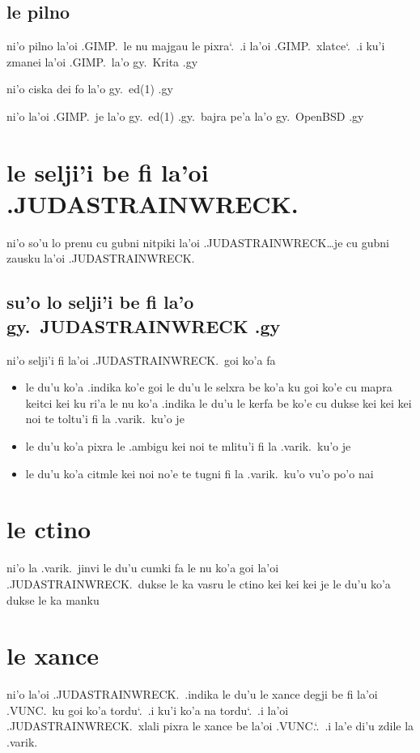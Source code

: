 \documentclass{report}
\newcommand\sds{\spacefactor\sfcode`.\ \space}
\begin{document}
\subsection{le pilno}
ni'o pilno la'oi .GIMP.\ le nu majgau le pixra\sds  .i  la'oi .GIMP.\ xlatce\sds  .i ku'i zmanei la'oi .GIMP.\ la'o gy.\ Krita .gy

ni'o ciska dei fo la'o gy.\ ed(1) .gy

ni'o la'oi .GIMP.\ je la'o gy.\ ed(1) .gy.\ bajra pe'a la'o gy.\ OpenBSD .gy

\section{le selji'i be fi la'oi .JUDASTRAINWRECK.}
ni'o so'u lo prenu cu gubni nitpiki la'oi .JUDASTRAINWRECK\ldots je cu gubni zausku la'oi .JUDASTRAINWRECK.

\subsection{su'o lo selji'i be fi la'o gy.\ JUDASTRAINWRECK .gy}
ni'o selji'i fi la'oi .JUDASTRAINWRECK.\ goi ko'a fa
\begin{itemize}
	\item le du'u ko'a .indika ko'e goi le du'u le selxra be ko'a ku goi ko'e cu mapra keitci kei ku ri'a le nu ko'a .indika le du'u le kerfa be ko'e cu dukse kei kei kei noi te toltu'i fi la .varik.\ ku'o je
	\item le du'u ko'a pixra le .ambigu kei noi te mlitu'i fi la .varik.\ ku'o je
	\item le du'u ko'a citmle kei noi no'e te tugni fi la .varik.\ ku'o
vu'o po'o nai
\end{itemize}
\section{le ctino}
ni'o la .varik.\ jinvi le du'u cumki fa le nu ko'a goi la'oi .JUDASTRAINWRECK.\ dukse le ka vasru le ctino kei kei kei je le du'u ko'a dukse le ka manku

\section{le xance}
ni'o la'oi .JUDASTRAINWRECK.\ .indika le du'u le xance degji be fi la'oi .VUNC.\ ku goi ko'a tordu\sds  .i ku'i ko'a na tordu\sds  .i la'oi .JUDASTRAINWRECK.\ xlali pixra le xance be la'oi .VUNC.\sds  .i la'e di'u zdile la .varik.
\end{document}
